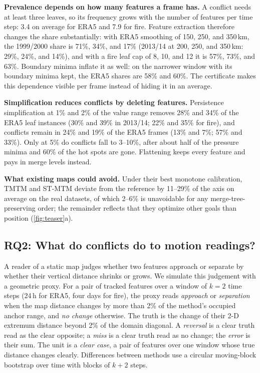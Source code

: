 \documentclass[review]{vgtc}                 %
\begin{document}
\textbf{Prevalence depends on how many features a frame has.} A conflict needs at least three leaves, so its frequency grows with the number of features per time step: 3.4 on average for ERA5 and 7.9 for fire. Feature extraction therefore changes the share substantially: with ERA5 smoothing of 150, 250, and 350\,km, the 1999/2000 share is 71\%, 34\%, and 17\% (2013/14 at 200, 250, and 350\,km: 29\%, 24\%, and 14\%), and with a fire leaf cap of 8, 10, and 12 it is 57\%, 73\%, and 63\%. Boundary minima inflate it as well: on the narrower window with its boundary minima kept, the ERA5 shares are 58\% and 60\%. The certificate makes this dependence visible per frame instead of hiding it in an average.

\textbf{Simplification reduces conflicts by deleting features.} Persistence simplification at 1\% and 2\% of the value range removes 28\% and 34\% of the ERA5 leaf instances (30\% and 39\% in 2013/14; 22\% and 35\% for fire), and conflicts remain in 24\% and 19\% of the ERA5 frames (13\% and 7\%; 57\% and 33\%). Only at 5\% do conflicts fall to 3--10\%, after about half of the pressure minima and 60\% of the hot spots are gone. Flattening keeps every feature and pays in merge levels instead.

\textbf{What existing maps could avoid.} Under their best monotone calibration, TMTM and ST-MTM deviate from the reference by 11--29\% of the axis on average on the real datasets, of which 2--6\% is unavoidable for any merge-tree-preserving order; the remainder reflects that they optimize other goals than position (\cref{fig:teaser}a).

\subsection{RQ2: What do conflicts do to motion readings?}\label{sec:rq2}
A reader of a static map judges whether two features approach or separate by whether their vertical distance shrinks or grows. We simulate this judgement with a geometric proxy. For a pair of tracked features over a window of $k=2$ time steps (24\,h for ERA5, four days for fire), the proxy reads \emph{approach} or \emph{separation} when the map distance changes by more than 2\% of the method's occupied anchor range, and \emph{no change} otherwise. The truth is the change of their 2-D extremum distance beyond 2\% of the domain diagonal. A \emph{reversal} is a clear truth read as the clear opposite; a \emph{miss} is a clear truth read as no change; the \emph{error} is their sum. The unit is a \emph{clear case}, a pair of features over one window whose true distance changes clearly. Differences between methods use a circular moving-block bootstrap over time with blocks of $k+2$ steps.
\end{document}
